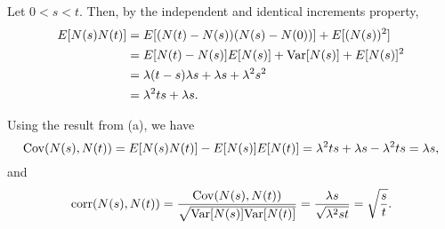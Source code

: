 \documentclass{homework}
\begin{document}
	\question 
	\begin{alphaparts}
		\questionpart Let $0 < s < t$. Then, by the independent and identical increments property,
		\begin{align*}
			E[N(s)N(t)] &= E[(N(t)-N(s))(N(s) - N(0))] + E[(N(s))^2] \\
			&= E[N(t) - N(s)]E[N(s)] + \mathrm{Var}[N(s)] + E[N(s)]^2 \\
			&= \lambda(t-s)\lambda s + \lambda s + \lambda^2s^2 \\
			&= \lambda^2 ts + \lambda s.
		\end{align*}
		
		\questionpart Using the result from (a), we have
		\begin{equation*}
			\mathrm{Cov}(N(s), N(t)) = E[N(s)N(t)] - E[N(s)]E[N(t)] = \lambda^2ts + \lambda s - \lambda^2ts = \lambda s,
		\end{equation*}
		and
		\begin{equation*}
			\mathrm{corr}(N(s), N(t)) = \frac{\mathrm{Cov}(N(s), N(t))}{\sqrt{\mathrm{Var}[N(s)]\mathrm{Var}[N(t)]}} = \frac{\lambda s}{\sqrt{\lambda^2 st}} = \sqrt{\frac{s}{t}}.
		\end{equation*}
	\end{alphaparts}
	
\end{document}

